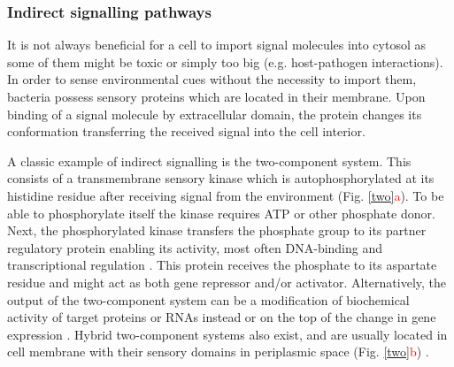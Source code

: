 \subsubsection{Indirect signalling pathways}
It is not always beneficial for a cell to import signal molecules into cytosol as some of them might be toxic or simply too big (e.g. host-pathogen interactions).
In order to sense environmental cues without the necessity to import them, bacteria possess sensory proteins which are located in their membrane.
Upon binding of a signal molecule by extracellular domain, the protein changes its conformation transferring the received signal into the cell interior.

A classic example of indirect signalling is the two-component system.
This consists of a transmembrane sensory kinase which is autophosphorylated at its histidine residue after receiving signal from the environment (Fig. \ref{two}\textcolor{red}{a}).
To be able to phosphorylate itself the kinase requires ATP or other phosphate donor.
Next, the phosphorylated kinase transfers the phosphate group to its partner regulatory protein enabling its activity, most often DNA-binding and transcriptional regulation \cite{lynch2012prioritization, gao2015temporal, cui2018novel}.
This protein receives the phosphate to its aspartate residue and might act as both gene repressor and/or activator.
Alternatively, the output of the two-component system can be a modification of biochemical activity of target proteins or RNAs instead or on the top of the change in gene expression \cite{shu2002antar, chambonnier2016hybrid}.
Hybrid two-component systems also exist, and are usually located in cell membrane with their sensory domains in periplasmic space (Fig. \ref{two}\textcolor{red}{b}) \cite{lynch2012prioritization, hirano2013regulon}.

